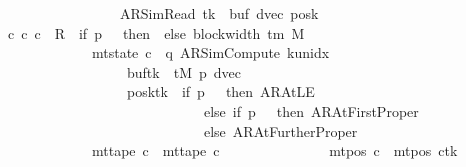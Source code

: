 \begin{isabellebody}
\ \ \ \ \ \ \ \ \ \ \ \ \ \ \ \ \ \ \ {\isacharparenleft}{\kern0pt}AR{\isacharunderscore}{\kern0pt}SimRead{\isacharcomma}{\kern0pt}\ tk{\isacharcomma}{\kern0pt}\ {}{\isacharcomma}{\kern0pt}\ buf{\isacharcomma}{\kern0pt}\ dvec{\isacharcomma}{\kern0pt}\ posk{\isacharparenright}{\kern0pt}{\isachardoublequoteclose}\isanewline
\ \ \ {\isachardoublequoteopen}{\isasymexists}c{\isacharprime}{\kern0pt}{\isacharprime}{\kern0pt}{\isachardot}{\kern0pt}\ {\isacharparenleft}{\kern0pt}c{\isacharprime}{\kern0pt}{\isacharcomma}{\kern0pt}\ c{\isacharprime}{\kern0pt}{\isacharprime}{\kern0pt}{\isacharparenright}{\kern0pt}\ {\isasymin}\ R{\isacharprime}{\kern0pt}\ {\isacharcircum}{\kern0pt}{\isacharcircum}{\kern0pt}\ {\isacharparenleft}{\kern0pt}if\ p\ {\isacharequal}{\kern0pt}\ {}\ then\ {}\ else\ block{\isacharunderscore}{\kern0pt}width\ {\isacharparenleft}{\kern0pt}{\isasymGamma}{\isacharunderscore}{\kern0pt}tm\ M{\isacharparenright}{\kern0pt}\ {\isacharplus}{\kern0pt}\ {}{\isacharparenright}{\kern0pt}\isanewline
\ \ \ \ \ \ \ \ \ \ \ \ \ \ {\isasymand}\ mt{\isacharunderscore}{\kern0pt}state\ c{\isacharprime}{\kern0pt}{\isacharprime}{\kern0pt}\ {\isacharequal}{\kern0pt}\ {\isacharparenleft}{\kern0pt}q{\isacharcomma}{\kern0pt}\ AR{\isacharunderscore}{\kern0pt}SimCompute{\isacharcomma}{\kern0pt}\ k{\isacharunderscore}{\kern0pt}unidx\ {}{\isacharcomma}{\kern0pt}\ {}{\isacharcomma}{\kern0pt}\isanewline
\ \ \ \ \ \ \ \ \ \ \ \ \ \ \ \ \ \ \ \ buf{\isacharparenleft}{\kern0pt}tk\ {\isacharcolon}{\kern0pt}{\isacharequal}{\kern0pt}\ tM\ p{\isacharparenright}{\kern0pt}{\isacharcomma}{\kern0pt}\ dvec{\isacharcomma}{\kern0pt}\isanewline
\ \ \ \ \ \ \ \ \ \ \ \ \ \ \ \ \ \ \ \ posk{\isacharparenleft}{\kern0pt}tk\ {\isacharcolon}{\kern0pt}{\isacharequal}{\kern0pt}\ if\ p\ {\isacharequal}{\kern0pt}\ {}\ then\ AR{\isacharunderscore}{\kern0pt}AtLE\isanewline
\ \ \ \ \ \ \ \ \ \ \ \ \ \ \ \ \ \ \ \ \ \ \ \ \ \ \ \ \ \ \ else\ if\ p\ {\isacharequal}{\kern0pt}\ {}\ then\ AR{\isacharunderscore}{\kern0pt}AtFirstProper\isanewline
\ \ \ \ \ \ \ \ \ \ \ \ \ \ \ \ \ \ \ \ \ \ \ \ \ \ \ \ \ \ \ else\ AR{\isacharunderscore}{\kern0pt}AtFurtherProper{\isacharparenright}{\kern0pt}{\isacharparenright}{\kern0pt}\isanewline
\ \ \ \ \ \ \ \ \ \ \ \ \ \ {\isasymand}\ mt{\isacharunderscore}{\kern0pt}tape\ c{\isacharprime}{\kern0pt}{\isacharprime}{\kern0pt}\ {\isacharequal}{\kern0pt}\ mt{\isacharunderscore}{\kern0pt}tape\ c{\isacharprime}{\kern0pt}\isanewline
\ \ \ \ \ \ \ \ \ \ \ \ \ \ {\isasymand}\ mt{\isacharunderscore}{\kern0pt}pos\ c{\isacharprime}{\kern0pt}{\isacharprime}{\kern0pt}\ {\isacharequal}{\kern0pt}\ {\isacharparenleft}{\kern0pt}mt{\isacharunderscore}{\kern0pt}pos\ c{\isacharprime}{\kern0pt}{\isacharparenright}{\kern0pt}{\isacharparenleft}{\kern0pt}tk\ {\isacharcolon}{\kern0pt}{\isacharequal}{\kern0pt}\isanewline

\end{isabellebody}
